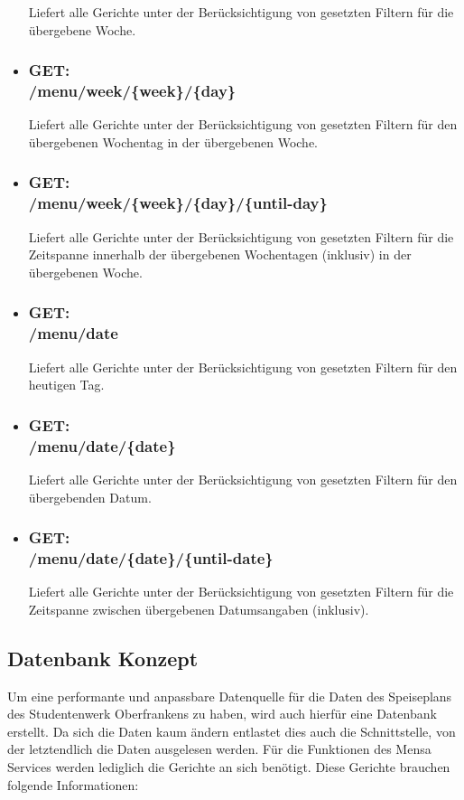 \begin{itemize}
Liefert alle Gerichte unter der Berücksichtigung von gesetzten Filtern für die übergebene Woche.
\item \subsubsection*{GET:\\ /menu/week/\{week\}/\{day\}} 
Liefert alle Gerichte unter der Berücksichtigung von gesetzten Filtern für den übergebenen Wochentag in der übergebenen Woche.
\item \subsubsection*{GET:\\ /menu/week/\{week\}/\{day\}/\{until-day\}} 
Liefert alle Gerichte unter der Berücksichtigung von gesetzten Filtern für die Zeitspanne innerhalb der übergebenen Wochentagen (inklusiv) in der übergebenen Woche.
\item \subsubsection*{GET:\\ /menu/date} 
Liefert alle Gerichte unter der Berücksichtigung von gesetzten Filtern für den heutigen Tag.
\item \subsubsection*{GET:\\ /menu/date/\{date\}} 
Liefert alle Gerichte unter der Berücksichtigung von gesetzten Filtern für den übergebenden Datum.
\item \subsubsection*{GET:\\ /menu/date/\{date\}/\{until-date\}} 
Liefert alle Gerichte unter der Berücksichtigung von gesetzten Filtern für die Zeitspanne zwischen übergebenen Datumsangaben (inklusiv).
\end{itemize}

\subsection*{Datenbank Konzept}
\label{sec:mensa_db}

Um eine performante und anpassbare Datenquelle für die Daten des Speiseplans des Studentenwerk Oberfrankens zu haben, wird auch hierfür eine Datenbank erstellt. Da sich die Daten kaum ändern entlastet dies auch die Schnittstelle, von der letztendlich die Daten ausgelesen werden. Für die Funktionen des Mensa Services werden lediglich die Gerichte an sich benötigt. Diese Gerichte brauchen folgende Informationen:

